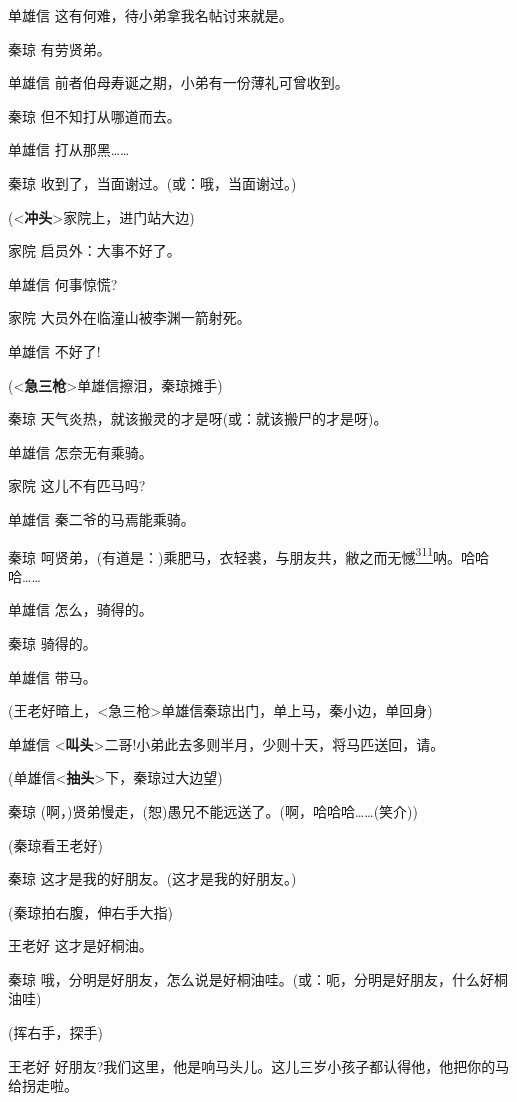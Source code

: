 单雄信 这有何难，待小弟拿我名帖讨来就是。

秦琼 有劳贤弟。

单雄信 前者伯母寿诞之期，小弟有一份薄礼可曾收到。

秦琼 但不知打从哪道而去。

单雄信 打从那黑\ldots{}\ldots{}

秦琼 收到了，当面谢过。(或：哦，当面谢过。)

(\textless{}\textbf{冲头}\textgreater{}家院上，进门站大边)

家院 启员外：大事不好了。

单雄信 何事惊慌?

家院 大员外在临潼山被李渊一箭射死。

单雄信 不好了!

(\textless{}\textbf{急三枪}\textgreater{}单雄信擦泪，秦琼摊手)

秦琼 天气炎热，就该搬灵的才是呀(或：就该搬尸的才是呀)。

单雄信 怎奈无有乘骑。

家院 这儿不有匹马吗?

单雄信 秦二爷的马焉能乘骑。

秦琼
呵贤弟，(有道是：)乘肥马，衣轻裘，与朋友共，敝之而无憾\protect\hyperlink{fn311}{\textsuperscript{311}}呐。哈哈哈\ldots{}\ldots{}

单雄信 怎么，骑得的。

秦琼 骑得的。

单雄信 带马。

(王老好暗上，\textless{}急三枪\textgreater{}单雄信秦琼出门，单上马，秦小边，单回身)

单雄信
\textless{}\textbf{叫头}\textgreater{}二哥!小弟此去多则半月，少则十天，将马匹送回，请。

(单雄信\textless{}\textbf{抽头}\textgreater{}下，秦琼过大边望)

秦琼
(啊，)贤弟慢走，(恕)愚兄不能远送了。(啊，哈哈哈\ldots{}\ldots{}(笑介))

(秦琼看王老好)

秦琼 这才是我的好朋友。(这才是我的好朋友。)

(秦琼拍右腹，伸右手大指)

王老好 这才是好桐油。

秦琼
哦，分明是好朋友，怎么说是好桐油哇。(或：呃，分明是好朋友，什么好桐油哇)

(挥右手，探手)

王老好
好朋友?我们这里，他是响马头儿。这儿三岁小孩子都认得他，他把你的马给拐走啦。

